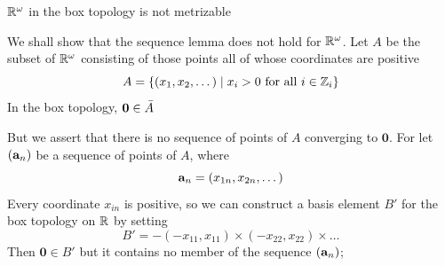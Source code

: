 \documentclass[11pt]{article}
\begin{document}
\begin{examplle}[]
\(\mathbb{R}^\omega\) in the box topology is not metrizable

We shall show that the sequence lemma does not hold for \(\mathbb{R}^\omega\). Let \(A\) be the subset
of \(\mathbb{R}^\omega\) consisting of those points all of whose coordinates are positive
\begin{equation*}
A=\{(x_1,x_2,\dots)\mid x_i>0\text{ for all }i\in\mathbb{Z}_i\}
\end{equation*}
In the box topology, \(\textbf{0}\in\bar{A}\)

But we assert that there is no sequence of points of \(A\) converging to \(\textbf{0}\). For
let \((\operatorname{\textbf{a}}_n)\) be a sequence of points of \(A\), where
\begin{equation*}
\operatorname{\textbf{a}}_n=(x_{1n},x_{2n},\dots)
\end{equation*}
Every coordinate \(x_{in}\) is positive, so we can construct a basis element \(B'\) for the box
topology on \(\mathbb{R}\) by setting
\begin{equation*}
B'=-(-x_{11},x_{11})\times(-x_{22},x_{22})\times\dots
\end{equation*}
Then \(\textbf{0}\in B'\) but it contains no member of the sequence \((\operatorname{\textbf{a}}_n)\);
\end{examplle}
\end{document}
